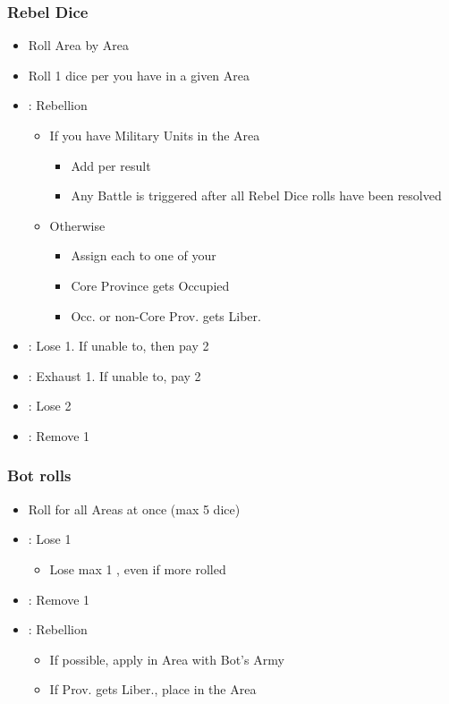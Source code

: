 \documentclass[10pt]{article}
\begin{document}
\subsubsection*{Rebel Dice}
\begin{itemize}
	\item Roll Area by Area
	\item Roll 1 dice per \unrest you have in a given Area
	\item \rebellion: Rebellion
	\begin{itemize}
		\item If you have Military Units in the Area
		\begin{itemize}
			\item Add \rebels per \rebellion result
			\item Any Battle is triggered after all Rebel Dice rolls have been resolved
		\end{itemize}
		\item Otherwise
		\begin{itemize}
			\item Assign each \rebellion to one of your \unrest
			\item Core Province gets Occupied
			\item Occ. or non-Core Prov. gets Liber.
		\end{itemize}
	\end{itemize}
	\item \losemonarchpower: Lose 1\monarchpower. If unable to, then pay 2\ducats
	\item \exhaustunits: Exhaust 1\manpower. If unable to, pay 2\ducats
	\item \loseducats: Lose 2\ducats
	\item \removeunrest: Remove 1 \unrest
\end{itemize}

\subsubsection*{\botrules Bot rolls }
{\botrules
\begin{itemize}
	\item Roll for all Areas at once (max 5 dice)
	\item \loseducats \exhaustunits \losemonarchpower: Lose 1 \botpower
	\begin{itemize}
		\item Lose max 1 \botpower, even if more rolled
	\end{itemize}
	\item \removeunrest: Remove 1 \unrest
	\item \rebellion: Rebellion
	\begin{itemize}
		\item If possible, apply in Area with Bot's Army
		\item If Prov. gets Liber., place \claim in the Area
	\end{itemize}
\end{itemize}
}
\end{document}
